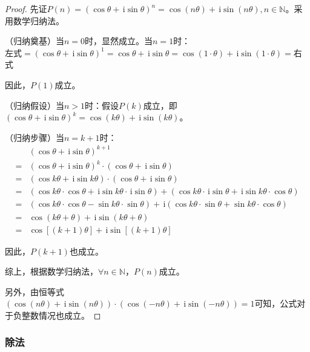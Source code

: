 \documentclass[a4paper,openany]{ctexbook}
\newcommand{\ii}{\,\mathrm{i}}
\begin{document}
\begin{proof}
    先证\(P ( n ) = ( \cos \theta + \ii \sin \theta )^n =\cos (n \theta) + \ii \sin (n \theta) , n \in\mathbb{N}\)。采用数学归纳法。

    （归纳奠基）当\(n=0\)时，显然成立。当\(n=1\)时：\\
    左式\( = ( \cos \theta + \ii \sin \theta )^1 =  \cos \theta + \ii \sin \theta  = \cos (1 \cdot \theta) + \ii \sin (1 \cdot \theta) =  \)右式

    因此，\(P(1)\)成立。

    （归纳假设）当\(n>1\)时：假设\(P(k)\)成立，即\((\cos\theta + \ii\sin\theta)^k = \cos (k\theta) + \ii\sin(k\theta)\)。

    （归纳步骤）当\(n=k+1\)时：
    \begin{align*}
          & (\cos\theta + \ii\sin\theta)^{k+1}                                                                                                              \\
        = & (\cos\theta + \ii\sin\theta)^{k} \cdot (\cos\theta + \ii\sin\theta)                                                                             \\
        = & (\cos k\theta + \ii\sin k\theta)  \cdot (\cos\theta + \ii\sin\theta)                                                                            \\
        = & (\cos k\theta  \cdot \cos\theta + \ii\sin k\theta  \cdot \ii\sin\theta) + (\cos k\theta  \cdot \ii\sin\theta+\ii\sin k\theta  \cdot \cos\theta) \\
        = & (\cos k\theta  \cdot \cos\theta - \sin k\theta  \cdot \sin\theta) + \ii(\cos k\theta  \cdot \sin\theta + \sin k \theta  \cdot \cos\theta)       \\
        = & \cos (k\theta+\theta) + \ii\sin (k\theta+\theta)                                                                                                \\
        = & \cos [(k+1)\theta] + \ii\sin [(k+1)\theta]
    \end{align*}

    因此，\(P(k+1)\)也成立。

    综上，根据数学归纳法，\(\forall n \in \mathbb{N}\)，\(P(n)\)成立。

    另外，由恒等式\( (\cos (n \theta)+\ii \sin (n \theta)) \cdot (\cos (-n \theta)+\ii \sin (-n \theta)) =1 \)可知，公式对于负整数情况也成立。
\end{proof}

\subsubsection{除法}
\end{document}
